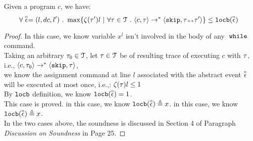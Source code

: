 \begin{lem}
  \label{lem:local_bound_sound}
Given a program ${c}$, we have:
%
\[
\forall \absevent = (l, dc, l') \st 
\max \left\{ \vcounter(\vtrace') l ~ \middle\vert~
\forall \vtrace \in \mathcal{T} \st \config{{c}, \trace} \to^{*} \config{\eskip, \trace\tracecat\vtrace'} \right\} 
\leq 
\locbound(\absevent)
\]
\end{lem}
\begin{proof}
  In this case, we know variable $x^l$ isn't involved in the body of any $\;\mathtt{while}\;$ command. 
  \\
  Taking an arbitrary $\mathtt{\tau}_0 \in \mathcal{T}$, 
  let $\mathtt{\tau} \in \mathcal{T}$ be of resulting trace of executing $c$ with $\mathtt{\tau}$, 
  i.e., $\langle {c}, \mathtt{\tau}_0 \rangle \to^{*} \langle \mathtt{skip}, \mathtt{\tau} \rangle$,
  \\
  we know the
  assignment command at line $l$ associated with the abstract event $\stackrel{\scriptscriptstyle{\alpha}}{\mathtt{\epsilon}{}}$ will be executed at most once, i.e.,:
  $\mathtt{\zeta}(\mathtt{\tau}) l \leq 1$
  \\
  By $\mathtt{locb}$ definition, we know $\mathtt{locb}(\stackrel{\scriptscriptstyle{\alpha}}{\mathtt{\epsilon}{}}) = 1$.
  \\
  This case is proved.
    in this case, we know $\mathtt{locb}(\stackrel{\scriptscriptstyle{\alpha}}{\mathtt{\epsilon}{}}) \triangleq x$.
    in this case, we know $\mathtt{locb}(\stackrel{\scriptscriptstyle{\alpha}}{\mathtt{\epsilon}{}}) \triangleq x$.
  \\
  In the two cases above, the soundness is discussed in \cite{sinn2017complexity} Section 4 of Paragraph \emph{Discussion on Soundness} in Page 25.
\end{proof}




